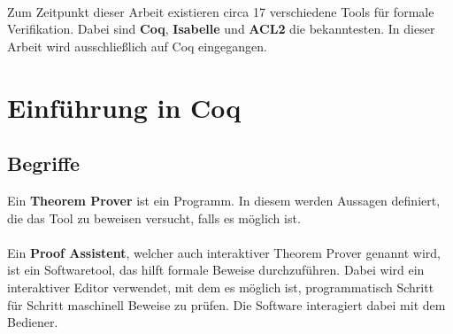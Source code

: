 \\
Zum Zeitpunkt dieser Arbeit existieren circa 17 verschiedene Tools für formale Verifikation. Dabei sind \textbf{Coq}, \textbf{Isabelle} und \textbf{ACL2} die bekanntesten.\cite{WIEDIJK01:FP}
In dieser Arbeit wird ausschließlich auf Coq eingegangen.

\section{Einführung in Coq}
\subsection{Begriffe}
Ein \textbf{Theorem Prover} ist ein Programm.
In diesem werden Aussagen definiert, die das Tool zu beweisen versucht, falls es möglich ist.\\
\\
Ein \textbf{Proof Assistent}, welcher auch interaktiver Theorem Prover genannt wird, ist ein Softwaretool, das hilft formale Beweise durchzuführen. Dabei wird ein interaktiver Editor verwendet, mit dem es möglich ist, programmatisch Schritt für Schritt maschinell Beweise zu prüfen. Die Software interagiert dabei mit dem Bediener.
 


